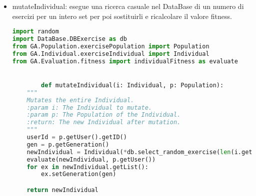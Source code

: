 \documentclass{article}
\begin{document}
    \begin{itemize}
        \item mutateIndividual: esegue una ricerca casuale nel DataBase di un numero di esercizi per un intero set per poi sostituirli e ricalcolare il valore fitness.
        \begin{lstlisting}[language=Python, breaklines, no caption]
import random
import DataBase.DBExercise as db
from GA.Population.exercisePopulation import Population
from GA.Individual.exerciseIndividual import Individual
from GA.Evaluation.fitness import individualFitness as evaluate


        def mutateIndividual(i: Individual, p: Population):
    """
    Mutates the entire Individual.
    :param i: The Individual to mutate.
    :param p: The Population of the Individual.
    :return: The new Individual after mutation.
    """
    userId = p.getUser().getID()
    gen = p.getGeneration()
    newIndividual = Individual(*db.select_random_exercise(len(i.getList()), userId))
    evaluate(newIndividual, p.getUser())
    for ex in newIndividual.getList():
        ex.setGeneration(gen)

    return newIndividual
        \end{lstlisting}
    \end{itemize}
\end{document}
